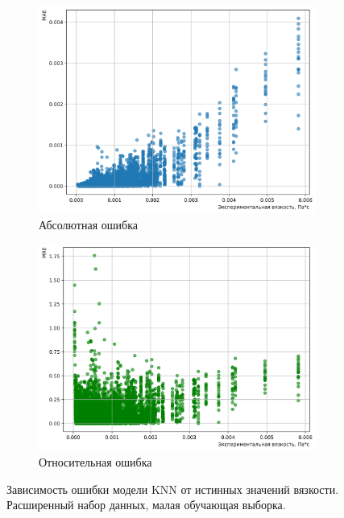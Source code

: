 \documentclass[a4paper,12pt]{article}
\begin{document}
      \begin{figure}[ht!]
        \centering
        \begin{subfigure}{0.48\textwidth}
            \centering
            \includegraphics[width=\linewidth]{knn/MAE_KNN (k=3)_0.8_rules.png}
            \caption{Абсолютная ошибка}
        \end{subfigure}
        \hfill
        \begin{subfigure}{0.48\textwidth}
            \centering
            \includegraphics[width=\linewidth]{knn/MRE_KNN (k=3)_0.8_rules.png}
            \caption{Относительная ошибка}
        \end{subfigure}
        \caption{Зависимость ошибки модели KNN от истинных значений вязкости. Расширенный набор данных, малая обучающая выборка.}
        \label{fig:knn_errors_08_rules}
      \end{figure}
\end{document}
